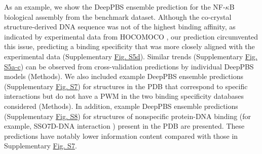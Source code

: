 \par
As an example, we show the DeepPBS ensemble prediction for the NF-$\kappa$B biological assembly from the benchmark dataset. Although the co-crystal structure-derived DNA sequence was not of the highest binding affinity, as indicated by experimental data from HOCOMOCO \citep{kulakovskiy2018hocomoco}, our prediction circumvented this issue, predicting a binding specificity that was more closely aligned with the experimental data (Supplementary \hyperref[fig:pdnaS5]{Fig. S5d}). Similar trends (Supplementary \hyperref[fig:pdnaS5]{Fig. S5a-c}) can be observed from cross-validation predictions by individual DeepPBS models (Methods). We also included example DeepPBS ensemble predictions (Supplementary \hyperref[fig:pdnaS7]{Fig. S7}) for structures in the PDB that correspond to specific interactions but do not have a PWM in the two binding specificity databases considered (Methods). In addition, example DeepPBS ensemble predictions (Supplementary \hyperref[fig:pdnaS8]{Fig. S8}) for structures of nonspecific protein-DNA binding (for example, SSO7D-DNA interaction \citep{Agback1998}) present in the PDB are presented. These predictions have notably lower information content compared with those in Supplementary \hyperref[fig:pdnaS7]{Fig. S7}.

